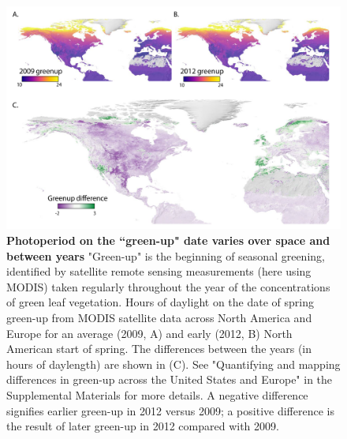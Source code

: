 \documentclass{article}
\begin{document}
 \begin{figure}[p]
\centering
\includegraphics{..//..//docs/photoperiod/figures/Greenup_corr_lets.pdf} %
\caption{\textbf{Photoperiod on the ``green-up" date varies over space and between years} "Green-up" is the beginning of seasonal greening, identified by satellite remote sensing measurements (here using MODIS) taken regularly throughout the year of the concentrations of green leaf vegetation. Hours of daylight on the date of spring green-up from MODIS satellite data across North America and Europe for an average (2009, A) and  early (2012, B) North American start of spring. The differences between the years (in hours of daylength) are shown in (C). See "Quantifying and mapping differences in green-up across the United States and Europe" in the Supplemental Materials for more details. A negative difference signifies earlier green-up in 2012 versus 2009; a positive difference is the result of later green-up in 2012 compared with 2009.}%
 \label{fig:greenup}%
 \end{figure}
 
\end{document}
